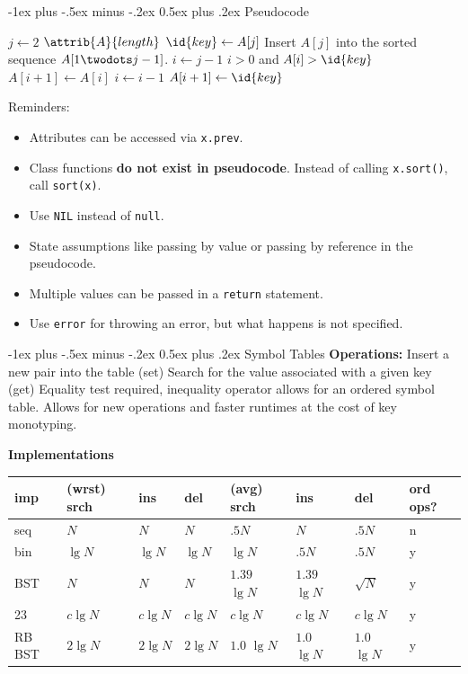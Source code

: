 \documentclass[letterpaper, 8pt]{extarticle}
\makeatletter
\renewcommand{\section}{\@startsection{section}{1}{0mm}%
                                {-1ex plus -.5ex minus -.2ex}%
                                {0.5ex plus .2ex}%
                                {\normalfont\normalsize\bfseries}}
\makeatother
\begin{document}
\begin{multicols*}{5}
  \section{Pseudocode}
  \begin{codebox}
    \li \For $j \gets 2$ \To $\attrib{A}{length}$
    \li   \Do
    $\id{key} \gets A[j]$
    \li     \Comment Insert $A[j]$ into the sorted sequence
    \li     \Comment $A[1 \twodots j-1]$.
    \li     $i \gets j-1$
    \li     \While $i > 0$ and $A[i] > \id{key}$
    \li       \Do
    $A[i+1] \gets A[i]$
    \li         $i \gets i-1$
    \End
    \li     $A[i+1] \gets \id{key}$
    \End
  \end{codebox}
  Reminders:
  \begin{itemize}
    \item Attributes can be accessed via \verb|x.prev|.
    \item Class functions \textbf{do not exist in pseudocode}.
          Instead of calling \verb|x.sort()|, call \verb|sort(x)|.
    \item Use \verb|NIL| instead of \verb|null|.
    \item State assumptions like passing by value or passing by reference
          in the pseudocode.
    \item Multiple values can be passed in a \verb|return| statement.
    \item Use \verb|error| for throwing an error, but what happens is not specified.
  \end{itemize}

  \section{Symbol Tables}
  \textbf{Operations:}
  Insert a new pair into the table (set)
  Search for the value associated with a given key (get)
  Equality test required, inequality operator allows for an ordered symbol table.
  Allows for new operations and faster runtimes at the cost of key monotyping.

  \textbf{Implementations}
  \begin{tabulary}{\linewidth}{@{}LLLLLLLL@{}} \toprule
    imp    & (wrst) srch & ins       & del       & (avg) srch     & ins            & del           & ord ops? \\ \midrule
    seq    & $N$          & $N$       & $N$       & $.5 N$         & $N$            & $.5 N$        & n    \\
    bin    & $\lg N$      & $\lg N$   & $\lg N$   & $\lg N$        & $.5 N$         & $.5 N$        & y    \\
    BST    & $N$          & $N$       & $N$       & $1.39$ $\lg N$ & $1.39$ $\lg N$ & $\sqrt N$     & y    \\
    23     & $c \lg N$    & $c \lg N$ & $c \lg N$ & $c \lg N$      & $c \lg N$      & $c \lg N$     & y    \\
    RB BST & $2 \lg N$    & $2 \lg N$ & $2 \lg N$ & $1.0$ $\lg N$  & $1.0$ $\lg N$  & $1.0$ $\lg N$ & y    \\
    \bottomrule
  \end{tabulary}


\end{multicols*}
\end{document}
